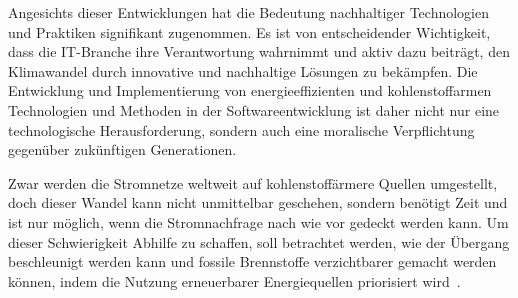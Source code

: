 Angesichts dieser Entwicklungen hat die Bedeutung nachhaltiger Technologien und Praktiken signifikant zugenommen.
Es ist von entscheidender Wichtigkeit, dass die \ac{IT}-Branche ihre Verantwortung wahrnimmt und aktiv dazu beiträgt, den Klimawandel durch innovative und nachhaltige Lösungen zu bekämpfen.
Die Entwicklung und Implementierung von energieeffizienten und kohlenstoffarmen Technologien und Methoden in der Softwareentwicklung ist daher nicht nur eine technologische Herausforderung, sondern auch eine moralische Verpflichtung gegenüber zukünftigen Generationen.

Zwar werden die Stromnetze weltweit auf kohlenstoffärmere Quellen umgestellt, doch dieser Wandel kann nicht unmittelbar geschehen, sondern benötigt Zeit und ist nur möglich, wenn die Stromnachfrage nach wie vor gedeckt werden kann.
Um dieser Schwierigkeit Abhilfe zu schaffen, soll betrachtet werden, wie der Übergang beschleunigt werden kann und fossile Brennstoffe verzichtbarer gemacht werden können, indem die Nutzung erneuerbarer Energiequellen priorisiert wird~\cite{GreenSoftwareFoundation.2022}.


